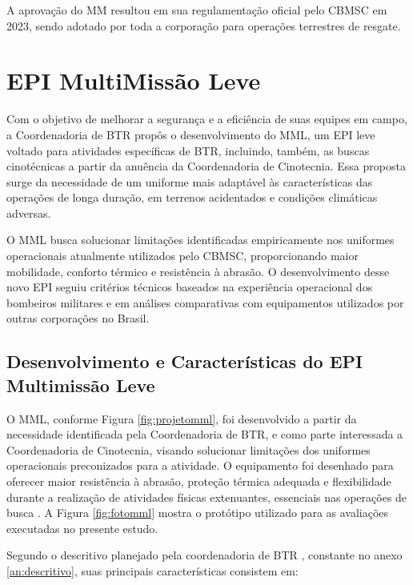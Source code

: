A aprovação do \acrlong{MM} resultou em sua regulamentação oficial pelo \acrshort{CBMSC} em 2023, 
sendo adotado por toda a corporação para operações terrestres de resgate.

\section{EPI MultiMissão Leve}

Com o objetivo de melhorar a segurança e a eficiência de suas equipes em campo, a Coordenadoria de \acrlong{BTR} propôs o desenvolvimento do \acrfull{MML}, um \acrshort{EPI} leve voltado para atividades específicas de \acrlong{BTR}, incluindo, também, as buscas cinotécnicas a partir da anuência da Coordenadoria de Cinotecnia. Essa proposta surge da necessidade de um uniforme mais adaptável às características das operações de longa duração, em terrenos acidentados e condições climáticas adversas.

O \acrshort{MML} busca solucionar limitações identificadas empiricamente nos uniformes operacionais atualmente utilizados pelo \acrshort{CBMSC}, proporcionando maior mobilidade, conforto térmico e resistência à abrasão. O desenvolvimento desse novo \acrshort{EPI} seguiu critérios técnicos baseados na experiência operacional dos bombeiros militares e em análises comparativas com equipamentos utilizados por outras corporações no Brasil.

\subsection{Desenvolvimento e Características do EPI Multimissão Leve}
    O \acrlong{MML}, conforme Figura \ref{fig:projetomml}, foi desenvolvido a partir da necessidade identificada pela Coordenadoria de \acrshort{BTR}, 
    e como parte interessada a Coordenadoria de Cinotecnia, visando solucionar limitações dos uniformes 
    operacionais preconizados para a atividade. O equipamento foi desenhado para oferecer maior 
    resistência à abrasão, proteção térmica adequada e flexibilidade durante a realização de 
    atividades físicas extenuantes, essenciais nas operações de busca \cite{relMML}. A Figura \ref{fig:fotomml} 
    mostra o protótipo utilizado para as avaliações executadas no presente estudo.

    Segundo o descritivo planejado pela coordenadoria de \acrlong{BTR} \cite{descritivoMML}, constante no anexo \ref{an:descritivo}, suas principais características consistem em:

